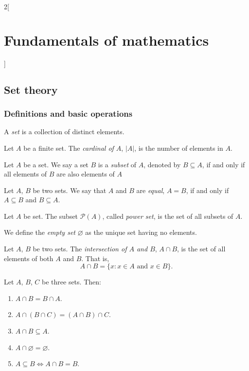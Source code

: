 \documentclass[../../../main.tex]{subfiles}
\begin{document}
\begin{multicols}{2}[\section{Fundamentals of mathematics}]
  \subsection{Set theory}
  \subsubsection{Definitions and basic operations}
  \begin{definition}
    A \textit{set} is a collection of distinct elements.
  \end{definition}
  \begin{definition}
    Let $A$ be a finite set. The \textit{cardinal of $A$}, $|A|$, is the number of elements in $A$.
  \end{definition}
  \begin{definition}
    Let $A$ be a set. We say a set $B$ is a \textit{subset} of $A$, denoted by $B\subseteq A$, if and only if all elements of $B$ are also elements of $A$
  \end{definition}
  \begin{definition}
    Let $A$, $B$ be two sets. We say that $A$ and $B$ are \textit{equal}, $A=B$, if and only if $A\subseteq B$ and $B\subseteq A$.
  \end{definition}
  \begin{definition}
    Let $A$ be set. The subset $\mathcal{P}(A)$, called \textit{power set}, is the set of all subsets of $A$.
  \end{definition}
  \begin{definition}
    We define the \textit{empty set} $\varnothing$ as the unique set having no elements.
  \end{definition}
  \begin{definition}
    Let $A$, $B$ be two sets. The \textit{intersection of $A$ and $B$}, $A\cap B$, is the set of all elements of both $A$ and $B$. That is, $$A\cap B=\{x:x\in A\text{ and }x\in B\}.$$
  \end{definition}
  \begin{prop}
    Let $A$, $B$, $C$ be three sets. Then:
    \begin{enumerate}
      \item $A\cap B=B\cap A$.
      \item $A\cap(B\cap C)=(A\cap B)\cap C$.
      \item $A\cap B\subseteq A$.
      \item $A\cap\varnothing=\varnothing$.
      \item $A\subseteq B\iff A\cap B=B$.

\end{enumerate}
\end{prop}
\end{multicols}
\end{document}
